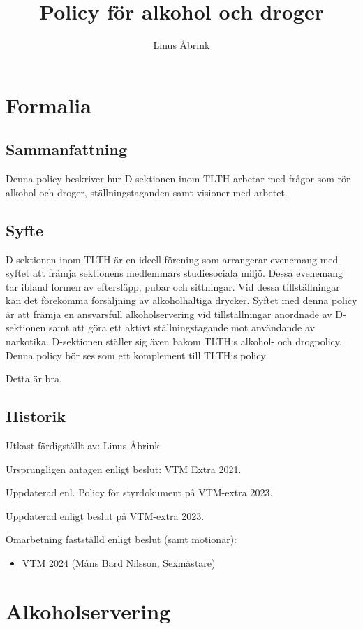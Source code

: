 \documentclass[]{dsekprotokoll}
\title{Policy för alkohol och droger}
\author{Linus Åbrink}
\begin{document}
\maketitle

\section{Formalia}

\subsection{Sammanfattning}
Denna policy beskriver hur D-sektionen inom TLTH arbetar med frågor som rör alkohol och droger, ställningstaganden samt visioner med arbetet.

\subsection{Syfte}
D-sektionen inom TLTH är en ideell förening som arrangerar evenemang
med syftet att främja sektionens medlemmars studiesociala miljö. Dessa evenemang tar ibland formen av eftersläpp, pubar och sittningar. Vid dessa tillställningar kan det förekomma försäljning av alkoholhaltiga drycker. Syftet med denna policy är att främja en ansvarsfull alkoholservering vid tillställningar anordnade av D-sektionen samt att göra ett aktivt ställningstagande mot användande av narkotika. D-sektionen ställer sig även bakom TLTH:s alkohol- och drogpolicy. Denna policy bör ses som ett komplement till TLTH:s policy

Detta är bra.

\subsection{Historik}
Utkast färdigställt av: Linus Åbrink

Ursprungligen antagen enligt beslut: VTM Extra 2021.

Uppdaterad enl. Policy för styrdokument på VTM-extra 2023.

Uppdaterad enligt beslut på VTM-extra 2023.

Omarbetning fastställd enligt beslut (samt motionär):
\begin{itemize}
    \item VTM 2024 (Måns Bard Nilsson, Sexmästare)
\end{itemize}

\section{Alkoholservering}
\end{document}
